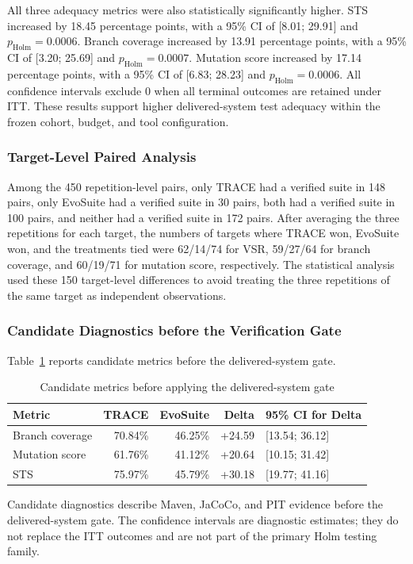 \documentclass[pdflatex,sn-basic,Numbered,iicol]{sn-jnl}
\begin{document}
All three adequacy metrics were also statistically significantly higher. STS increased by 18.45 percentage points, with a 95\% CI of [8.01; 29.91] and $p_{\mathrm{Holm}}=0.0006$. Branch coverage increased by 13.91 percentage points, with a 95\% CI of [3.20; 25.69] and $p_{\mathrm{Holm}}=0.0007$. Mutation score increased by 17.14 percentage points, with a 95\% CI of [6.83; 28.23] and $p_{\mathrm{Holm}}=0.0006$. All confidence intervals exclude 0 when all terminal outcomes are retained under ITT. These results support higher delivered-system test adequacy within the frozen cohort, budget, and tool configuration.

\subsubsection{Target-Level Paired Analysis}\label{subsubsec:trace-paired}

Among the 450 repetition-level pairs, only TRACE had a verified suite in 148 pairs, only EvoSuite had a verified suite in 30 pairs, both had a verified suite in 100 pairs, and neither had a verified suite in 172 pairs. After averaging the three repetitions for each target, the numbers of targets where TRACE won, EvoSuite won, and the treatments tied were 62/14/74 for VSR, 59/27/64 for branch coverage, and 60/19/71 for mutation score, respectively. The statistical analysis used these 150 target-level differences to avoid treating the three repetitions of the same target as independent observations.

\subsubsection{Candidate Diagnostics before the Verification Gate}\label{subsubsec:trace-candidate}

Table~\ref{tab:trace-candidate} reports candidate metrics before the delivered-system gate.

\begin{table}[htbp]
\caption{Candidate metrics before applying the delivered-system gate}\label{tab:trace-candidate}
\centering
\scriptsize
\begin{tabularx}{\textwidth}{@{}>{\raggedright\arraybackslash}X r r r l@{}}
\toprule
Metric & TRACE & EvoSuite & Delta & 95\% CI for Delta \\
\midrule
Branch coverage & 70.84\% & 46.25\% & +24.59 & [13.54; 36.12] \\
Mutation score & 61.76\% & 41.12\% & +20.64 & [10.15; 31.42] \\
STS & 75.97\% & 45.79\% & +30.18 & [19.77; 41.16] \\
\bottomrule
\end{tabularx}
\begin{tablenotes}
\item Candidate diagnostics describe Maven, JaCoCo, and PIT evidence before the delivered-system gate. The confidence intervals are diagnostic estimates; they do not replace the ITT outcomes and are not part of the primary Holm testing family.
\end{tablenotes}
\end{table}
\end{document}
